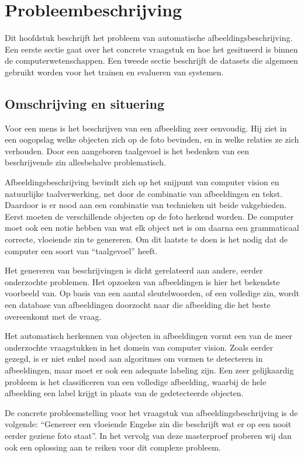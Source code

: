 \chapter{Probleembeschrijving}
\label{chap:Probleembeschrijving}

Dit hoofdstuk beschrijft het probleem van automatische afbeeldingsbeschrijving. Een eerste sectie gaat over het concrete vraagstuk en hoe het gesitueerd is binnen de computerwetenschappen. Een tweede sectie beschrijft de datasets die algemeen gebruikt worden voor het trainen en evalueren van systemen.

\section{Omschrijving en situering}
\label{sec:Omschrijving en situering}
Voor een mens is het beschrijven van een afbeelding zeer eenvoudig. Hij ziet in een oogopslag welke objecten zich op de foto bevinden, en in welke relaties ze zich verhouden. Door een aangeboren taalgevoel is het bedenken van een beschrijvende zin allesbehalve problematisch.

Afbeeldingsbeschrijving bevindt zich op het snijpunt van computer vision en natuurlijke taalverwerking, net door de combinatie van afbeeldingen en tekst. Daardoor is er nood aan een combinatie van technieken uit beide vakgebieden. Eerst moeten de verschillende objecten op de foto herkend worden. De computer moet ook een notie hebben van wat elk object net is om daarna een grammaticaal correcte, vloeiende zin te genereren. Om dit laatste te doen is het nodig dat de computer een soort van ``taalgevoel'' heeft.

Het genereren van beschrijvingen is dicht gerelateerd aan andere, eerder onderzochte problemen. Het opzoeken van afbeeldingen is hier het bekendste voorbeeld van. Op basis van een aantal sleutelwoorden, of een volledige zin, wordt een database van afbeeldingen doorzocht naar die afbeelding die het beste overeenkomt met de vraag.

Het automatisch herkennen van objecten in afbeeldingen vormt een van de meer onderzochte vraagstukken in het domein van computer vision. Zoals eerder gezegd, is er niet enkel nood aan algoritmes om vormen te detecteren in afbeeldingen, maar moet er ook een adequate labeling zijn. Een zeer gelijkaardig probleem is het classificeren van een volledige afbeelding, waarbij de hele afbeelding een label krijgt in plaats van de gedetecteerde objecten.

De concrete probleemstelling voor het vraagstuk van afbeeldingsbeschrijving is de volgende: ``Genereer een vloeiende Engelse zin die beschrijft wat er op een nooit eerder geziene foto staat''. In het vervolg van deze masterproef proberen wij dan ook een oplossing aan te reiken voor dit complexe probleem. 

